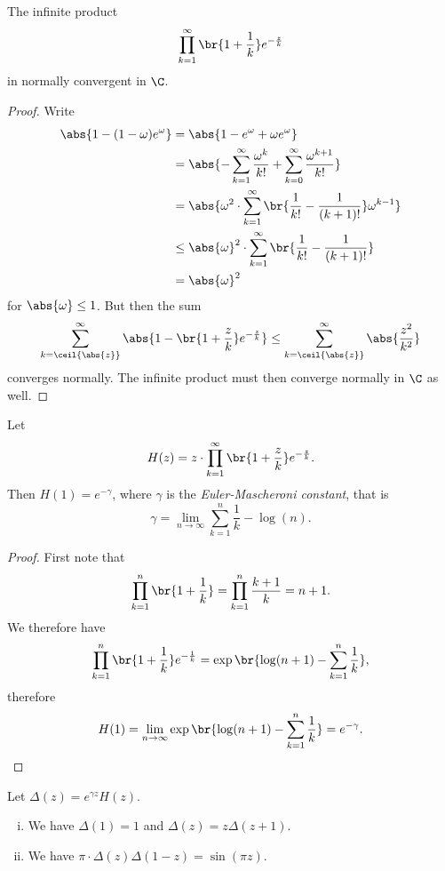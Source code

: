 
\begin{lema}
The infinite product
\[
\prod_{k=1}^\infty \br{1 + \frac{1}{k}} e^{-\frac{z}{k}}
\]
in normally convergent in $\C$.
\end{lema}

\begin{proof}
Write
\begin{align*}
\abs{1 - (1-\omega) e^\omega} &=
\abs{1 - e^\omega + \omega e^\omega}
\\
&=
\abs{-\sum_{k=1}^\infty \frac{\omega^k}{k!} +
\sum_{k=0}^\infty \frac{\omega^{k+1}}{k!}}
\\
&=
\abs{\omega^2 \cdot \sum_{k=1}^\infty
\br{\frac{1}{k!} - \frac{1}{(k+1)!}} \omega^{k-1}}
\\
&\leq
\abs{\omega}^2 \cdot \sum_{k=1}^\infty
\br{\frac{1}{k!} - \frac{1}{(k+1)!}}
\\
&=
\abs{\omega}^2
\end{align*}
for $\abs{\omega} \leq 1$. But then the sum
\[
\sum_{k = \ceil{\abs{z}}}^\infty
\abs{1 - \br{1 + \frac{z}{k}} e^{-\frac{z}{k}}} \leq
\sum_{k = \ceil{\abs{z}}}^\infty \abs{\frac{z^2}{k^2}}
\]
converges normally. The infinite product must then converge
normally in $\C$ as well.
\end{proof}

\begin{lema}
Let
\[
H(z) =
z \cdot \prod_{k=1}^\infty \br{1 + \frac{z}{k}} e^{-\frac{z}{k}}.
\]
Then $H(1) = e^{-\gamma}$, where $\gamma$ is the
\emph{Euler-Mascheroni constant},
that is
\[
\gamma = \lim_{n \to \infty} \sum_{k=1}^n \frac{1}{k} - \log(n).
\]
\end{lema}

\begin{proof}
First note that
\[
\prod_{k=1}^n \br{1 + \frac{1}{k}} =
\prod_{k=1}^n \frac{k+1}{k} =
n+1.
\]
We therefore have
\[
\prod_{k=1}^n \br{1 + \frac{1}{k}} e^{-\frac{1}{k}} =
\exp \br{\log(n+1) - \sum_{k=1}^n \frac{1}{k}},
\]
therefore
\[
H(1) =
\lim_{n \to \infty}
\exp \br{\log(n+1) - \sum_{k=1}^n \frac{1}{k}} =
e^{-\gamma}. \qedhere
\]
\end{proof}

\begin{lema}
Let $\Delta(z) = e^{\gamma z} H(z)$.

\begin{enumerate}[i)]
\item We have $\Delta(1) = 1$ and $\Delta(z) = z \Delta(z+1)$.
\item We have $\pi \cdot \Delta(z) \Delta(1-z) = \sin(\pi z)$.
\end{enumerate}
\end{lema}

